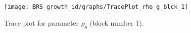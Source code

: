 \begin{figure}[H]
\centering
  \texttt{[image: BRS\_growth\_id/graphs/TracePlot\_rho\_g\_blck\_1]}\\
    \caption{Trace plot for parameter ${\rho_g}$ (block number 1).}
\end{figure}
